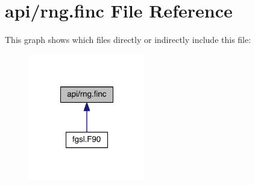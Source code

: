 \hypertarget{rng_8finc}{\section{api/rng.finc File Reference}
\label{rng_8finc}
}
This graph shows which files directly or indirectly include this file\-:\nopagebreak
\begin{figure}[H]
\begin{center}
\leavevmode
\includegraphics[width=144pt]{rng_8finc__dep__incl}
\end{center}
\end{figure}
